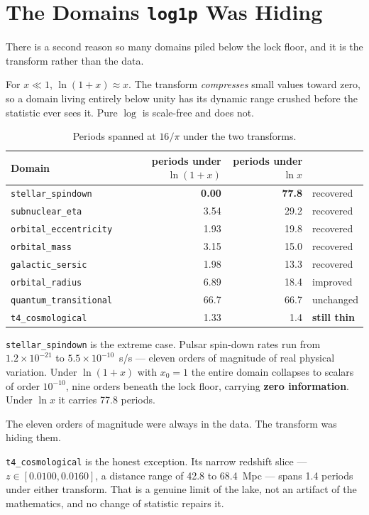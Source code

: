 \documentclass[11pt, letterpaper, openany]{book}
\begin{document}
\section{The Domains \texttt{log1p} Was Hiding}

There is a second reason so many domains piled below the lock floor, and it is the transform
rather than the data.

For $x \ll 1$, $\ln(1+x) \approx x$. The transform \emph{compresses} small values toward zero,
so a domain living entirely below unity has its dynamic range crushed before the statistic ever
sees it. Pure $\log$ is scale-free and does not.

\begin{table}[H]
\centering
\small
\begin{tabular}{@{}lrrl@{}}
\toprule
\textbf{Domain} & \textbf{periods under $\ln(1+x)$} & \textbf{periods under $\ln x$} & \\
\midrule
\texttt{stellar\_spindown} & \textbf{0.00} & \textbf{77.8} & recovered \\
\texttt{subnuclear\_eta} & 3.54 & 29.2 & recovered \\
\texttt{orbital\_eccentricity} & 1.93 & 19.8 & recovered \\
\texttt{orbital\_mass} & 3.15 & 15.0 & recovered \\
\texttt{galactic\_sersic} & 1.98 & 13.3 & recovered \\
\texttt{orbital\_radius} & 6.89 & 18.4 & improved \\
\texttt{quantum\_transitional} & 66.7 & 66.7 & unchanged \\
\texttt{t4\_cosmological} & 1.33 & 1.4 & \textbf{still thin} \\
\bottomrule
\end{tabular}
\caption{Periods spanned at $16/\pi$ under the two transforms.}
\end{table}

\texttt{stellar\_spindown} is the extreme case. Pulsar spin-down rates run from
$1.2\times10^{-21}$ to $5.5\times10^{-10}$~s/s --- eleven orders of magnitude of real physical
variation. Under $\ln(1+x)$ with $x_0 = 1$ the entire domain collapses to scalars of order
$10^{-10}$, nine orders beneath the lock floor, carrying \textbf{zero information}. Under
$\ln x$ it carries 77.8 periods.

\begin{nullbox}
The eleven orders of magnitude were always in the data. The transform was hiding them.

\medskip
\noindent \texttt{t4\_cosmological} is the honest exception. Its narrow redshift slice ---
$z \in [0.0100, 0.0160]$, a distance range of 42.8 to 68.4~Mpc --- spans 1.4 periods under
either transform. That is a genuine limit of the lake, not an artifact of the mathematics, and
no change of statistic repairs it.
\end{nullbox}
\end{document}
